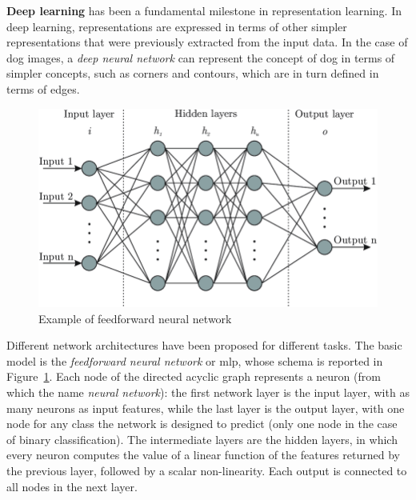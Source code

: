 \documentclass[%
    corpo=12pt,
    twoside,
    stile=classica,   
    tipotesi=magistrale,
    evenboxes,
    english,
	numerazioneromana,
]{toptesi}
\begin{document}
\bigskip
\textbf{Deep learning} has been a fundamental milestone in representation learning. In deep learning, representations are expressed in terms of other simpler representations that were previously extracted from the input data. In the case of dog images, a \textit{deep neural network} can represent the concept of dog in terms of simpler concepts, such as corners and contours, which are in turn defined in terms of edges.

\begin{figure}[ht]
	\centering
	\includegraphics[width=.8\linewidth]{imgs/mlp.png}
	\caption{Example of feedforward neural network}
	\label{fig:mlp}
\end{figure}

\medskip
Different network architectures have been proposed for different tasks. The basic model is the \textit{feedforward neural network} or \gls{mlp}, whose schema is reported in Figure~\ref{fig:mlp}. Each node of the directed acyclic graph represents a neuron (from which the name \textit{neural network}): the first network layer is the input layer, with as many neurons as input features, while the last layer is the output layer, with one node for any class the network is designed to predict (only one node in the case of binary classification). The intermediate layers are the hidden layers, in which every neuron computes the value of a linear function of the features returned by the previous layer, followed by a scalar non-linearity. Each output is connected to all nodes in the next layer.
\end{document}
